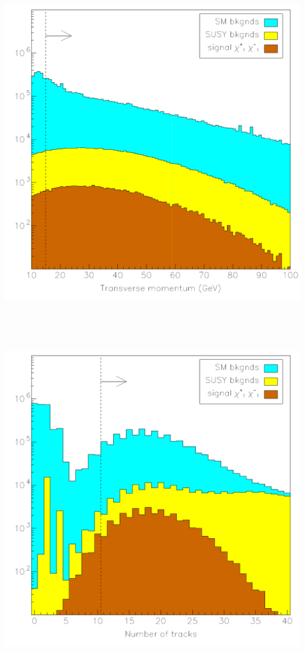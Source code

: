 \documentclass[landscape]{article}
\begin{document}
\mbox{ }

\vfill

\begin{center}
  \includegraphics[width=0.7\linewidth]{allnew_2.pdf}
\end{center}

\vfill

\mbox{ }

\pagebreak

\mbox{ }

\vfill

\begin{center}
  \includegraphics[width=0.7\linewidth]{allnew_3.pdf}
\end{center}

\vfill

\mbox{ }

\pagebreak
\end{document}
